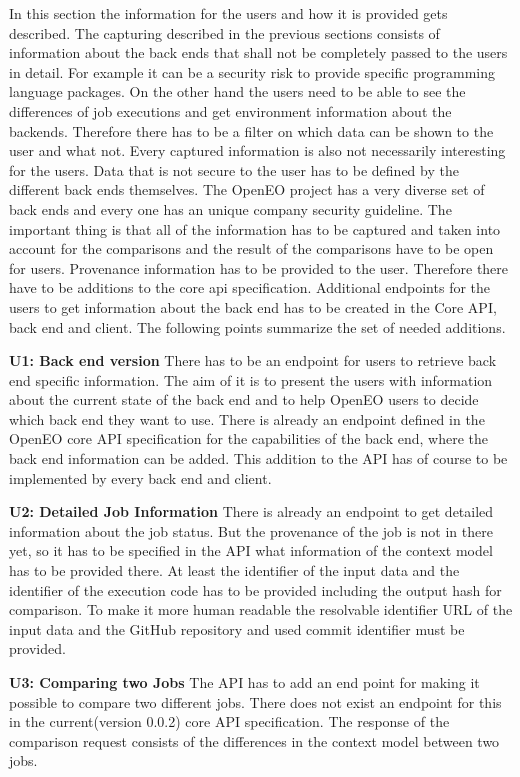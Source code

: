 \documentclass[draft,final]{vutinfth} %
\begin{document}
In this section the information for the users and how it is provided gets described. The capturing described in the previous sections consists of  information about the back ends that shall not be completely passed to the users in detail. For example it can be a security risk to provide specific programming language packages. On the other hand the users need to be able to see the differences of job executions and get environment information about the backends. Therefore there has to be a filter on which data can be shown to the user and what not. Every captured information is also not necessarily interesting for the users. Data that is not secure to the user has to be defined by the different back ends themselves. The OpenEO project has a very diverse set of back ends and every one has an unique company security guideline. The important thing is that all of the information has to be captured and taken into account for the comparisons and the result of the comparisons have to be open for users.
Provenance information has to be provided to the user. Therefore there have to be additions to the core api specification. Additional endpoints for the users to get information about the back end has to be created in the Core API, back end and client. The following points summarize the set of needed additions. 

\textbf{U1: Back end version}
There has to be an endpoint for users to retrieve back end specific information. The aim of it is to present the users with information about the current state of the back end and to help OpenEO users to decide which back end they want to use. There is already an endpoint defined in the OpenEO core API specification for the capabilities of the back end, where the back end information can be added. This addition to the API has of course to be implemented by every back end and client.

\textbf{U2: Detailed Job Information}
There is already an endpoint to get detailed information about the job status. But the provenance of the job is not in there yet, so it has to be specified in the API what information of the context model has to be provided there. At least the identifier of the input data and the identifier of the execution code has to be provided including the output hash for comparison. To make it more human readable the resolvable identifier URL of the input data and the GitHub repository and used commit identifier must be provided.   

\textbf{U3: Comparing two Jobs}
The API has to add an end point for making it possible to compare two different jobs. There does not exist an endpoint for this in the current(version 0.0.2) core API specification. The response of the comparison request consists of the differences in the context model between two jobs. 
\end{document}
